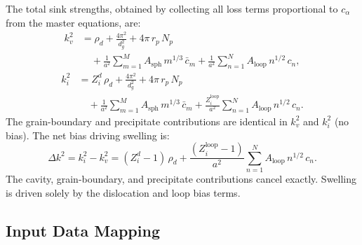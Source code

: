 \documentclass[pdflatex,sn-basic]{sn-jnl} %
\begin{document}
The total sink strengths, obtained by collecting all loss terms proportional
to $c_\alpha$ from the master equations, are:
\begin{equation}\label{eq:kv2}
\begin{split}
  k_v^2 &= \rho_d
          + \frac{4\pi^2}{d_g^2}
          + 4\pi\,r_p\,N_p
          \\
          &\quad+ \frac{1}{a^2}\sum_{m=1}^{M}
            A_{\mathrm{sph}}\,m^{1/3}\,\bar{c}_m
          + \frac{1}{a^2}\sum_{n=1}^{N}
            A_{\mathrm{loop}}\,n^{1/2}\,c_n,
\end{split}
\end{equation}
\begin{equation}\label{eq:ki2}
\begin{split}
  k_i^2 &= Z_i^d\,\rho_d
          + \frac{4\pi^2}{d_g^2}
          + 4\pi\,r_p\,N_p
          \\
          &\quad+ \frac{1}{a^2}\sum_{m=1}^{M}
            A_{\mathrm{sph}}\,m^{1/3}\,\bar{c}_m
          + \frac{Z_i^{\mathrm{loop}}}{a^2}\sum_{n=1}^{N}
            A_{\mathrm{loop}}\,n^{1/2}\,c_n.
\end{split}
\end{equation}
The grain-boundary and precipitate contributions are identical in $k_v^2$
and $k_i^2$ (no bias). The net bias driving swelling is:
\begin{equation}\label{eq:Dk2}
    \Delta k^2 = k_i^2 - k_v^2
    = (Z_i^d - 1)\,\rho_d
    + \frac{(Z_i^{\mathrm{loop}} - 1)}{a^2}\sum_{n=1}^{N}
      A_{\mathrm{loop}}\,n^{1/2}\,c_n.
\end{equation}
The cavity, grain-boundary, and precipitate contributions cancel exactly.
Swelling is driven solely by the dislocation and loop bias terms.


\subsection{Input Data Mapping}
\label{sec:input_mapping}
\end{document}
